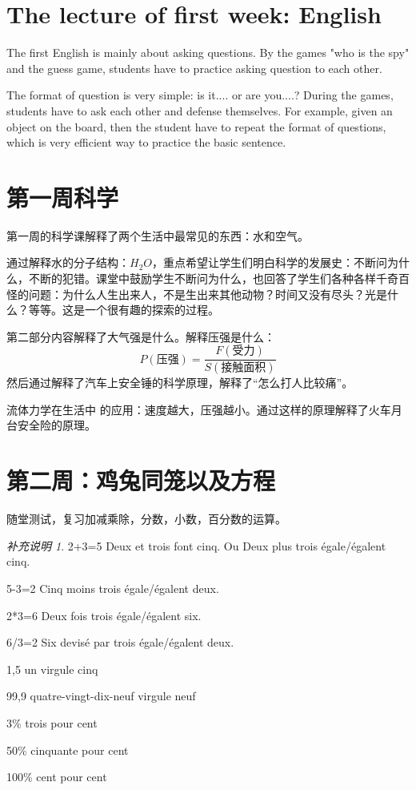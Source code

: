 \documentclass{article}
\theoremstyle{definition}
\theoremstyle{remark}
\newtheorem{rem}{补充说明}
\theoremstyle{theorem}
\begin{document}
\section{The lecture of first week: English}
The first English is mainly about asking questions. By the games "who is the spy" and the guess game, students have to practice asking question to each other.

The format of question is very simple: is it.... or are you....? During the games, students have to ask each other and defense themselves. For example, given an object on the board, then the student have to repeat the format of questions, which is very efficient way to practice the basic sentence.
\section{第一周科学}
第一周的科学课解释了两个生活中最常见的东西：水和空气。

通过解释水的分子结构：$H_{2}O$，重点希望让学生们明白科学的发展史：不断问为什么，不断的犯错。课堂中鼓励学生不断问为什么，也回答了学生们各种各样千奇百怪的问题：为什么人生出来人，不是生出来其他动物？时间又没有尽头？光是什么？等等。这是一个很有趣的探索的过程。

第二部分内容解释了大气强是什么。解释压强是什么：
\begin{equation*}
    P(\textbf{压强})=\frac{F(\textbf{受力})}{S(\textbf{接触面积})}
\end{equation*}
然后通过解释了汽车上安全锤的科学原理，解释了“怎么打人比较痛”。

流体力学在生活中 的应用：速度越大，压强越小。通过这样的原理解释了火车月台安全险的原理。
\section{第二周：鸡兔同笼以及方程}
随堂测试，复习加减乘除，分数，小数，百分数的运算。
\begin{rem}
    2+3=5        Deux et trois font cinq. Ou
             Deux plus trois égale/égalent cinq.
             
5-3=2        Cinq moins trois égale/égalent deux.

2*3=6        Deux fois trois égale/égalent six.

6/3=2        Six devisé par trois égale/égalent deux.

1,5   un virgule cinq

99,9  quatre-vingt-dix-neuf virgule neuf

3\%    trois pour cent

50\%   cinquante pour cent

100\%  cent pour cent
\end{rem}
\end{document}

